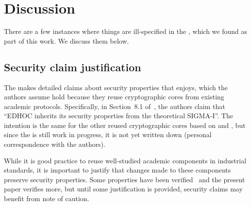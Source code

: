 \documentclass[runningheads, envcountsame, a4paper, draft, x11names]{llncs}
\newcommand{\spacehack}{\vspace{-1em}}
\newcommand{\fillhack}{\vspace{-0.5em}}
\begin{document}
\section{Discussion}
\label{sec:discussion}
\fillhack
{}
There are a few instances where things are ill-specified in the \mSpec{},
which we found as part of this work. We discuss them below.
%
\spacehack

\subsection{Security claim justification}
\label{sec:securityClaims}
\fillhack
The \mSpec{} makes detailed claims about security properties that \mEdhoc{}
enjoys, which the authors assume hold because they reuse cryptographic cores
from existing academic protocols.
%
Specifically, in Section~8.1 of~\cite{selander-lake-edhoc-01}, the authors
claim that ``EDHOC inherits its security properties from the theoretical
SIGMA-I''.
%
The intention is the same for the other reused cryptographic
cores based on \mOptls{} and \mNoise{}, but since the \mSpec{} is still work in
progress, it is not yet written down (personal correspondence with the authors).
%

While it is good practice to reuse well-studied academic components in
industrial standards, it is important to justify that changes made to these
components preserve security properties.
%
Some properties have been verified~\cite{DBLP:conf/secsr/BruniJPS18} and the
present paper verifies more, but until some justification is provided, security
claims may benefit from note of caution.
\spacehack
{}

\end{document}
